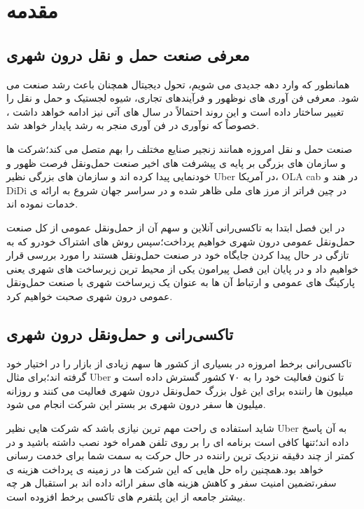 \chapter{مقدمه}

\section{معرفی صنعت حمل و نقل درون شهری}
همانطور که وارد دهه جدیدی می شویم، تحول دیجیتال همچنان باعث رشد صنعت می شود. معرفی فن آوری های نوظهور و فرآیندهای تجاری، شیوه لجستیک و حمل و نقل را تغییر ساختار داده است و این روند احتمالاً در سال های آتی نیز ادامه خواهد داشت ، خصوصاً که نوآوری در فن آوری منجر به رشد پایدار خواهد شد.

صنعت حمل و نقل امروزه همانند زنجیر صنایع مختلف را بهم متصل می کند؛‌شرکت ها و سازمان های بزرگی بر پایه ی پیشرفت های اخیر صنعت حمل‌و‌نقل فرصت ظهور و خودنمایی پیدا کرده اند و سازمان های بزرگی نظیر Uber در آمریکا، OLA cab در هند و DiDi در چین فراتر از مرز های ملی ظاهر شده و در سراسر جهان شروع به ارائه ی خدمات نموده اند.

در این فصل ابتدا به تاکسی‌رانی آنلاین و سهم آن از حمل‌و‌نقل عمومی از کل صنعت حمل‌و‌نقل عمومی درون شهری خواهیم پرداخت؛سپس روش های اشتراک خودرو که به تازگی در حال پیدا کردن جایگاه خود در صنعت حمل‌و‌نقل هستند را مورد بررسی قرار خواهیم داد و در پایان این فصل پیرامون یکی از محیط ترین زیرساخت های شهری یعنی پارکینگ های عمومی و ارتباط آن ها به عنوان یک زیرساخت شهری با صنعت حمل‌و‌نقل عمومی درون شهری صحبت خواهیم کرد.
\section{تاکسی‌رانی و حمل‌و‌نقل درون شهری}
تاکسی‌رانی برخط  امروزه در بسیاری از کشور ها سهم زیادی از بازار را در اختیار خود گرفته اند؛برای مثال Uber تا کنون فعالیت خود را به ۷۰ کشور گسترش داده است و میلیون ها راننده برای این غول بزرگ حمل‌و‌نقل درون شهری فعالیت می کنند و روزانه میلیون ها سفر درون شهری بر بستر این شرکت انجام می شود.

شاید استفاده ی راحت مهم ترین نیازی باشد که شرکت هایی نظیر Uber به آن پاسخ داده اند؛تنها کافی است برنامه ای را بر روی تلفن همراه خود نصب داشته باشید و در کمتر از چند دقیقه نزدیک ترین راننده در حال حرکت به سمت شما برای خدمت رسانی خواهد بود.همچنین راه حل هایی که این شرکت ها در زمینه ی پرداخت هزینه ی سفر،‌تضمین امنیت سفر و کاهش هزینه های سفر ارائه داده اند بر استقبال هر چه بیشتر جامعه از این پلتفرم  های تاکسی برخط افزوده است.


